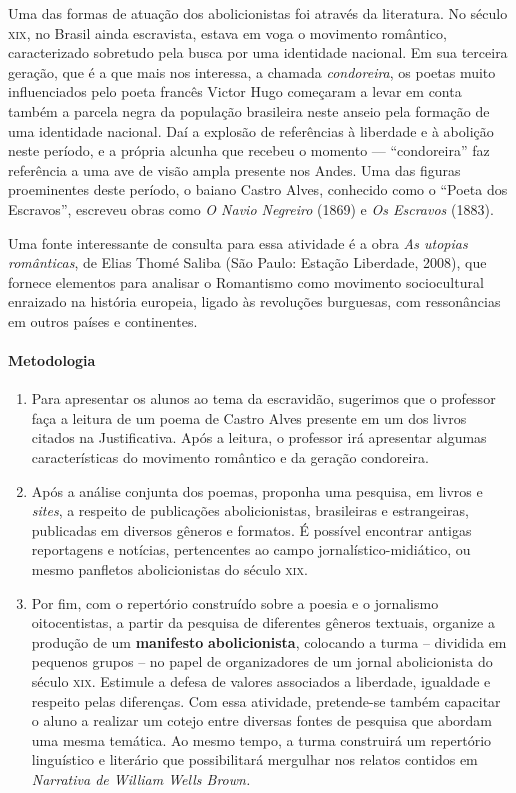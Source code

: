 \documentclass[11pt]{extarticle}
\begin{document}
Uma das formas de atuação dos abolicionistas foi através
da literatura. No século \textsc{xix}, no Brasil ainda escravista,
estava em voga o movimento romântico, caracterizado sobretudo pela busca 
por uma identidade nacional. Em sua terceira geração, que é a que mais nos
interessa, a chamada
\emph{condoreira}, os poetas muito influenciados pelo poeta francês Victor Hugo
começaram a levar em conta também a parcela negra da população brasileira
neste anseio pela formação de uma identidade nacional. Daí a explosão 
de referências à liberdade e à abolição neste período, e a própria
alcunha que recebeu o momento --- ``condoreira'' faz referência a 
uma ave de visão ampla presente nos Andes. Uma das figuras proeminentes 
deste período, o baiano Castro Alves, conhecido como o ``Poeta 
dos Escravos'', escreveu obras como \emph{O Navio Negreiro} (1869) e 
\emph{Os Escravos} (1883).

Uma fonte interessante de consulta para essa atividade é a obra
\emph{As utopias românticas}, de Elias Thomé Saliba (São Paulo: Estação
Liberdade, 2008), que fornece elementos para analisar o Romantismo como
movimento sociocultural enraizado na história europeia, ligado às
revoluções burguesas, com ressonâncias em outros países e continentes.

\paragraph{Metodologia}
   \begin{enumerate}
    \item
    Para apresentar os alunos ao tema da escravidão, sugerimos que o 
    professor faça a leitura de um poema de Castro Alves presente
    em um dos livros citados na Justificativa. Após a leitura,
    o professor irá apresentar algumas características do movimento
    romântico e da geração condoreira.
    \item
    Após a análise conjunta dos poemas, proponha uma pesquisa, em
    livros e \emph{sites}, a respeito de publicações abolicionistas, brasileiras e 
    estrangeiras, publicadas em diversos gêneros e formatos. É possível
  encontrar antigas reportagens e notícias, pertencentes ao campo
  jornalístico-midiático, ou mesmo panfletos abolicionistas do século
  \textsc{xix}.
    \item
    Por fim, com o repertório construído sobre a poesia
  e o jornalismo oitocentistas, a partir da pesquisa de diferentes
  gêneros textuais, organize a produção de um \textbf{manifesto}
  \textbf{abolicionista}, colocando a turma -- dividida em pequenos
  grupos -- no papel de organizadores de um jornal abolicionista do
  século \textsc{xix}. Estimule a defesa de valores associados a liberdade,
  igualdade e respeito pelas diferenças. Com essa atividade, pretende-se
  também capacitar o aluno a realizar um cotejo entre diversas fontes de
  pesquisa que abordam uma mesma temática. Ao mesmo tempo, a turma
  construirá um repertório linguístico e literário que possibilitará
  mergulhar nos relatos contidos em \emph{Narrativa de William Wells
  Brown.}

   \end{enumerate}
\end{document}
